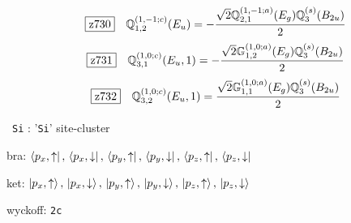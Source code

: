 \documentclass[fleqn,10pt,landscape]{jsarticle}
\begin{document}
\begin{dmath*}
\hspace*{3mm}\fbox{z730}\quad \mathbb{Q}_{1,2}^{(1,-1;c)}(E_{u})=- \frac{\sqrt{2} \mathbb{Q}_{2,1}^{(1,-1;a)}(E_{g}) \mathbb{Q}_{3}^{(s)}(B_{2u})}{2}
\end{dmath*}
\begin{dmath*}
\hspace*{3mm}\fbox{z731}\quad \mathbb{Q}_{3,1}^{(1,0;c)}(E_{u},1)=- \frac{\sqrt{2} \mathbb{G}_{1,2}^{(1,0;a)}(E_{g}) \mathbb{Q}_{3}^{(s)}(B_{2u})}{2}
\end{dmath*}
\begin{dmath*}
\hspace*{3mm}\fbox{z732}\quad \mathbb{Q}_{3,2}^{(1,0;c)}(E_{u},1)=\frac{\sqrt{2} \mathbb{G}_{1,1}^{(1,0;a)}(E_{g}) \mathbb{Q}_{3}^{(s)}(B_{2u})}{2}
\end{dmath*}
\vspace{5mm}

\noindent\textbullet\, \texttt{Si} : '\texttt{Si}' site-cluster

\noindent\quad * bra: $\bra{p_{x},\uparrow},\, \bra{p_{x},\downarrow},\, \bra{p_{y},\uparrow},\, \bra{p_{y},\downarrow},\, \bra{p_{z},\uparrow},\, \bra{p_{z},\downarrow}$

\noindent\quad * ket: $\ket{p_{x},\uparrow},\, \ket{p_{x},\downarrow},\, \ket{p_{y},\uparrow},\, \ket{p_{y},\downarrow},\, \ket{p_{z},\uparrow},\, \ket{p_{z},\downarrow}$

\noindent\quad * wyckoff: \texttt{2c}
\end{document}

